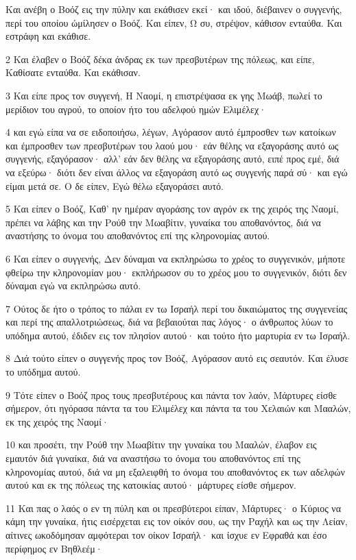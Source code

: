 \par Και ανέβη ο Βοόζ εις την πύλην και εκάθισεν εκεί· και ιδού, διέβαινεν ο συγγενής, περί του οποίου ώμίλησεν ο Βοόζ. Και είπεν, Ω συ, στρέψον, κάθισον ενταύθα. Και εστράφη και εκάθισε.
\par 2 Και έλαβεν ο Βοόζ δέκα άνδρας εκ των πρεσβυτέρων της πόλεως, και είπε, Καθίσατε ενταύθα. Και εκάθισαν.
\par 3 Και είπε προς τον συγγενή, Η Ναομί, η επιστρέψασα εκ γης Μωάβ, πωλεί το μερίδιον του αγρού, το οποίον ήτο του αδελφού ημών Ελιμέλεχ·
\par 4 και εγώ είπα να σε ειδοποιήσω, λέγων, Αγόρασον αυτό έμπροσθεν των κατοίκων και έμπροσθεν των πρεσβυτέρων του λαού μου· εάν θέλης να εξαγοράσης αυτό ως συγγενής, εξαγόρασον· αλλ' εάν δεν θέλης να εξαγοράσης αυτό, ειπέ προς εμέ, διά να εξεύρω· διότι δεν είναι άλλος να εξαγοράση αυτό ως συγγενής παρά σύ· και εγώ είμαι μετά σε. Ο δε είπεν, Εγώ θέλω εξαγοράσει αυτό.
\par 5 Και είπεν ο Βοόζ, Καθ' ην ημέραν αγοράσης τον αγρόν εκ της χειρός της Ναομί, πρέπει να λάβης και την Ρούθ την Μωαβίτιν, γυναίκα του αποθανόντος, διά να αναστήσης το όνομα του αποθανόντος επί της κληρονομίας αυτού.
\par 6 Και είπεν ο συγγενής, Δεν δύναμαι να εκπληρώσω το χρέος το συγγενικόν, μήποτε φθείρω την κληρονομίαν μου· εκπλήρωσον συ το χρέος μου το συγγενικόν, διότι δεν δύναμαι εγώ να εκπληρώσω αυτό.
\par 7 Ούτος δε ήτο ο τρόπος το πάλαι εν τω Ισραήλ περί του δικαιώματος της συγγενείας και περί της απαλλοτριώσεως, διά να βεβαιούται πας λόγος· ο άνθρωπος λύων το υπόδημα αυτού, έδιδεν εις τον πλησίον αυτού· και τούτο ήτο μαρτυρία εν τω Ισραήλ.
\par 8 Διά τούτο είπεν ο συγγενής προς τον Βοόζ, Αγόρασον αυτό εις σεαυτόν. Και έλυσε το υπόδημα αυτού.
\par 9 Τότε είπεν ο Βοόζ προς τους πρεσβυτέρους και πάντα τον λαόν, Μάρτυρες είσθε σήμερον, ότι ηγόρασα πάντα τα του Ελιμέλεχ και πάντα τα του Χελαιών και Μααλών, εκ της χειρός της Ναομί·
\par 10 και προσέτι, την Ρούθ την Μωαβίτιν την γυναίκα του Μααλών, έλαβον εις εμαυτόν διά γυναίκα, διά να αναστήσω το όνομα του αποθανόντος επί της κληρονομίας αυτού, διά να μη εξαλειφθή το όνομα του αποθανόντος εκ των αδελφών αυτού και εκ της πόλεως της κατοικίας αυτού· μάρτυρες είσθε σήμερον.
\par 11 Και πας ο λαός ο εν τη πύλη και οι πρεσβύτεροι είπαν, Μάρτυρες· ο Κύριος να κάμη την γυναίκα, ήτις εισέρχεται εις τον οίκόν σου, ως την Ραχήλ και ως την Λείαν, αίτινες ωκοδόμησαν αμφότεραι τον οίκον Ισραήλ· και ίσχυε εν Εφραθά και έσο περίφημος εν Βηθλεέμ·
